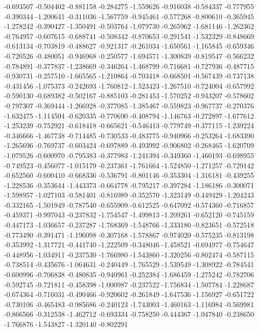 -0.693507
-0.504402
-0.881158
-0.284275
-1.559626
-0.916038
-0.584337
-0.777955
-0.390344
-1.200641
-0.311036
-1.567759
-0.945461
-0.577268
-0.800610
-0.365945
-1.278242
-0.390427
-1.350491
-0.503764
-1.079730
-0.265962
-1.681146
-1.262362
-0.764957
-0.607615
-0.688741
-0.508342
-0.870653
-0.291541
-1.532329
-0.848669
-0.613134
-0.703819
-0.488627
-0.921317
-0.261034
-1.650561
-1.165845
-0.659346
-0.720526
-0.480051
-0.946968
-0.250577
-1.694571
-1.300839
-0.819547
-0.566232
-0.784891
-0.377837
-1.238669
-0.346264
-1.468799
-0.716681
-0.727936
-0.487715
-0.930731
-0.257510
-1.665565
-1.210864
-0.703418
-0.668501
-0.567439
-0.737138
-0.431456
-1.075373
-0.242693
-1.760812
-1.523423
-1.267510
-0.724004
-0.657992
-0.590130
-0.689382
-0.502167
-0.885103
-0.281453
-1.570252
-0.943207
-0.578602
-0.797307
-0.369444
-1.266928
-0.377085
-1.385467
-0.559823
-0.967737
-0.270376
-1.632475
-1.114504
-0.620335
-0.770690
-0.408794
-1.146763
-0.272897
-1.677612
-1.253239
-0.752921
-0.618418
-0.665621
-0.546413
-0.779749
-0.377115
-1.239224
-0.346666
-1.467738
-0.714485
-0.730533
-0.483775
-0.940966
-0.253264
-1.683390
-1.265696
-0.769737
-0.603424
-0.697889
-0.493992
-0.906802
-0.268465
-1.620709
-1.079526
-0.600970
-0.795383
-0.377983
-1.241394
-0.349360
-1.460193
-0.698955
-0.749523
-0.456077
-1.015179
-0.237361
-1.761664
-1.524850
-1.271257
-0.729142
-0.652560
-0.600410
-0.668336
-0.536791
-0.801146
-0.353304
-1.316181
-0.439255
-1.228536
-0.353644
-1.443373
-0.664778
-0.795217
-0.397284
-1.186186
-0.300071
-1.598957
-1.027103
-0.581401
-0.816989
-0.352570
-1.323149
-0.449429
-1.204243
-0.332165
-1.501949
-0.787540
-0.655909
-0.612525
-0.647092
-0.574360
-0.716857
-0.459371
-0.997043
-0.237832
-1.754547
-1.499813
-1.209261
-0.652120
-0.745159
-0.447173
-1.036657
-0.237287
-1.768369
-1.548766
-1.333180
-0.823651
-0.572518
-0.773490
-0.391471
-1.196098
-0.307168
-1.578867
-0.974020
-0.575235
-0.813198
-0.353992
-1.317721
-0.441740
-1.222509
-0.348046
-1.458521
-0.694977
-0.754647
-0.448956
-1.034911
-0.237530
-1.766980
-1.543860
-1.320256
-0.802474
-0.587115
-0.738514
-0.435676
-1.064631
-0.240449
-1.765529
-1.539549
-1.308922
-0.784541
-0.600996
-0.706838
-0.480835
-0.940961
-0.252384
-1.686459
-1.275242
-0.782706
-0.592745
-0.721811
-0.458398
-1.000987
-0.237522
-1.756834
-1.507784
-1.228687
-0.674364
-0.716031
-0.490466
-0.920602
-0.261849
-1.647536
-1.156927
-0.651722
-0.730106
-0.465483
-0.985686
-0.240123
-1.743003
-1.460163
-1.116984
-0.569981
-0.866566
-0.312538
-1.462712
-0.693334
-0.758250
-0.444367
-1.047840
-0.238650
-1.766876
-1.543827
-1.320140
-0.802291
